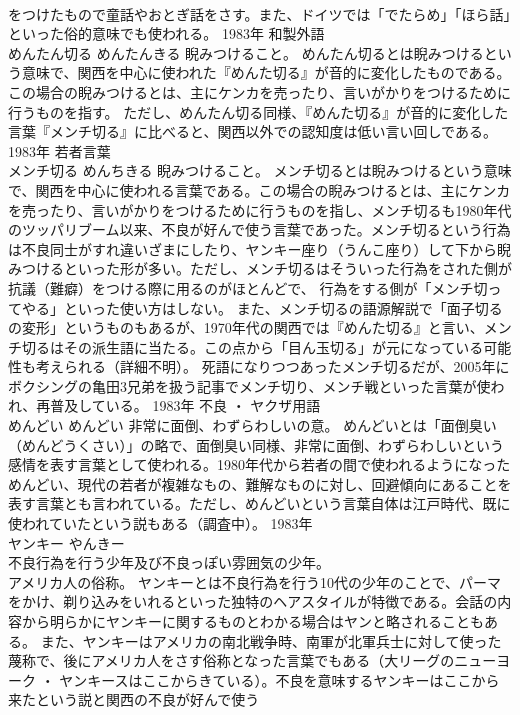 \documentclass[8pt]{extreport}
\begin{document}
\begin{CJK}{UTF8}{min}
\\	をつけたもので童話やおとぎ話をさす。また、ドイツでは「でたらめ」「ほら話」といった俗的意味でも使われる。	1983年	和製外語	
\\	めんたん切る	めんたんきる	睨みつけること。	めんたん切るとは睨みつけるという意味で、関西を中心に使われた『めんた切る』が音的に変化したものである。この場合の睨みつけるとは、主にケンカを売ったり、言いがかりをつけるために行うものを指す。 ただし、めんたん切る同様、『めんた切る』が音的に変化した言葉『メンチ切る』に比べると、関西以外での認知度は低い言い回しである。	1983年	若者言葉	
\\	メンチ切る	めんちきる	睨みつけること。	メンチ切るとは睨みつけるという意味で、関西を中心に使われる言葉である。この場合の睨みつけるとは、主にケンカを売ったり、言いがかりをつけるために行うものを指し、メンチ切るも1980年代のツッパリブーム以来、不良が好んで使う言葉であった。メンチ切るという行為は不良同士がすれ違いざまにしたり、ヤンキー座り（うんこ座り）して下から睨みつけるといった形が多い。ただし、メンチ切るはそういった行為をされた側が抗議（難癖）をつける際に用るのがほとんどで、 行為をする側が「メンチ切ってやる」といった使い方はしない。 また、メンチ切るの語源解説で「面子切るの変形」というものもあるが、1970年代の関西では『めんた切る』と言い、メンチ切るはその派生語に当たる。この点から「目ん玉切る」が元になっている可能性も考えられる（詳細不明）。 死語になりつつあったメンチ切るだが、2005年にボクシングの亀田3兄弟を扱う記事でメンチ切り、メンチ戦といった言葉が使われ、再普及している。	1983年	不良 ・ ヤクザ用語	
\\	めんどい	めんどい	非常に面倒、わずらわしいの意。	めんどいとは「面倒臭い（めんどうくさい）」の略で、面倒臭い同様、非常に面倒、わずらわしいという感情を表す言葉として使われる。1980年代から若者の間で使われるようになっためんどい、現代の若者が複雑なもの、難解なものに対し、回避傾向にあることを表す言葉とも言われている。ただし、めんどいという言葉自体は江戸時代、既に使われていたという説もある（調査中）。	1983年	
\\	ヤンキー	やんきー	
\\	不良行為を行う少年及び不良っぽい雰囲気の少年。 
\\	アメリカ人の俗称。	ヤンキーとは不良行為を行う10代の少年のことで、パーマをかけ、剃り込みをいれるといった独特のヘアスタイルが特徴である。会話の内容から明らかにヤンキーに関するものとわかる場合はヤンと略されることもある。 また、ヤンキーはアメリカの南北戦争時、南軍が北軍兵士に対して使った蔑称で、後にアメリカ人をさす俗称となった言葉でもある（大リーグのニューヨーク ・ ヤンキースはここからきている）。不良を意味するヤンキーはここから来たという説と関西の不良が好んで使う

\end{CJK}
\end{document}
